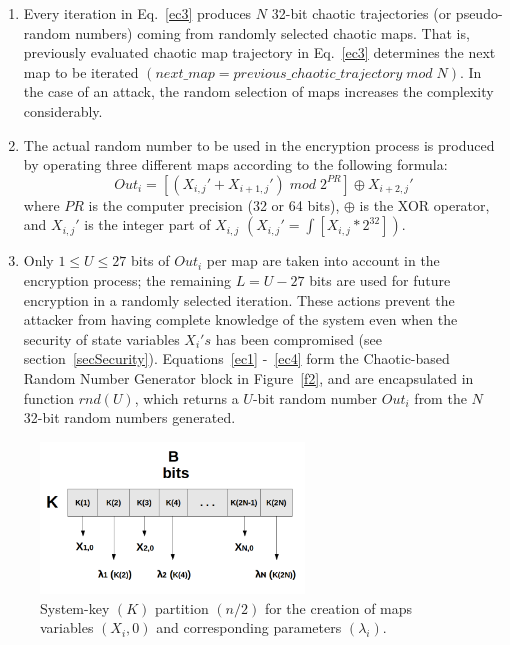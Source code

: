 \documentclass[preprint]{elsarticle}
\begin{document}
\begin{enumerate}
\item Every iteration in Eq.~\ref{ec3} produces $N$ 32-bit chaotic trajectories (or pseudo-random numbers) coming from randomly selected chaotic maps. That is, previously evaluated chaotic map trajectory in Eq.~\ref{ec3} determines the next map to be iterated $(next\_map = previous\_chaotic\_trajectory\; mod\; N)$. In the case of an attack, the random selection of maps increases the complexity considerably.

\item The actual random number to be used in the encryption process is produced by operating three different maps according to the following formula:
\begin{equation}
Out_{i}= \left[  (X_{i,j}' + X_{i+1,j}')\; mod \;2^{PR}   \right] \oplus X_{i+2,j}'
\label{ec4}
\end{equation}
where $PR$ is the computer precision (32 or 64 bits), $\oplus$ is the XOR operator, and $X_{i,j}'$ is the integer part of $X_{i,j}$ $(X_{i,j}' =\int [X_{i,j} \ast 2^{32} ])$.

\item Only $1 \leq U \leq 27$ bits of $Out_{i}$ per map are taken into account in the encryption process; the remaining $L=U-27$ bits are used for future encryption in a randomly selected iteration. These actions prevent the attacker from having complete knowledge of the system even when the security of state variables $X_{i}'s$ has been compromised (see section~\ref{secSecurity}). Equations~\ref{ec1} -~\ref{ec4} form the Chaotic-based Random Number Generator block in Figure~\ref{f2}, and are encapsulated in function $rnd (U)$, which returns a $U$-bit random number $Out_{i}$ from the $N$ 32-bit random numbers generated.
\end{enumerate}

\begin{figure}[!ht]
\centering
\includegraphics[width=7cm]{figure3.png}
\caption{System-key $(K)$ partition $(n/2)$ for the creation of maps variables $(X_{i},0)$ and corresponding parameters $(\lambda_{i})$.}
\label{f3}
\end{figure}
\end{document}
